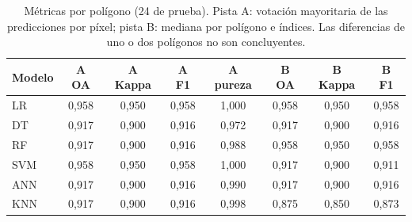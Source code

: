 \begin{table}[htbp]
 \centering
 \small
\setlength{\tabcolsep}{3.5pt}
 \caption{Métricas por polígono (24 de prueba). Pista A: votación mayoritaria de las predicciones por píxel; pista B: mediana por polígono e índices. Las diferencias de uno o dos polígonos no son concluyentes.}
 \label{tab:metricas_poligono}
 \begin{tabular}{lccccccc}
  \toprule
  Modelo & A OA & A Kappa & A F1 & A pureza & B OA & B Kappa & B F1 \\
  \midrule
  LR & 0{,}958 & 0{,}950 & 0{,}958 & 1{,}000 & 0{,}958 & 0{,}950 & 0{,}958 \\
  DT & 0{,}917 & 0{,}900 & 0{,}916 & 0{,}972 & 0{,}917 & 0{,}900 & 0{,}916 \\
  RF & 0{,}917 & 0{,}900 & 0{,}916 & 0{,}988 & 0{,}958 & 0{,}950 & 0{,}958 \\
  SVM & 0{,}958 & 0{,}950 & 0{,}958 & 1{,}000 & 0{,}917 & 0{,}900 & 0{,}911 \\
  ANN & 0{,}917 & 0{,}900 & 0{,}916 & 0{,}990 & 0{,}917 & 0{,}900 & 0{,}916 \\
  KNN & 0{,}917 & 0{,}900 & 0{,}916 & 0{,}998 & 0{,}875 & 0{,}850 & 0{,}873 \\
  \bottomrule
 \end{tabular}
\end{table}
